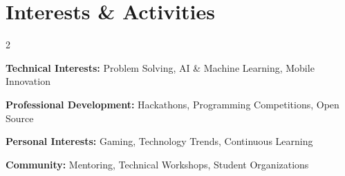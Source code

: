 \documentclass[letterpaper,11pt]{article}
\newcommand{\skillCategory}[2]{
  \begin{skillbox}
    \textbf{\color{secondary}#1:} \color{darkgray}#2
  \end{skillbox}
  \vspace{3pt}
}
\begin{document}
\section{Interests \& Activities}
\begin{multicols}{2}
\skillCategory{Technical Interests}{Problem Solving, AI \& Machine Learning, Mobile Innovation}
\skillCategory{Professional Development}{Hackathons, Programming Competitions, Open Source}
\skillCategory{Personal Interests}{Gaming, Technology Trends, Continuous Learning}
\skillCategory{Community}{Mentoring, Technical Workshops, Student Organizations}
\end{multicols}
\end{document}
